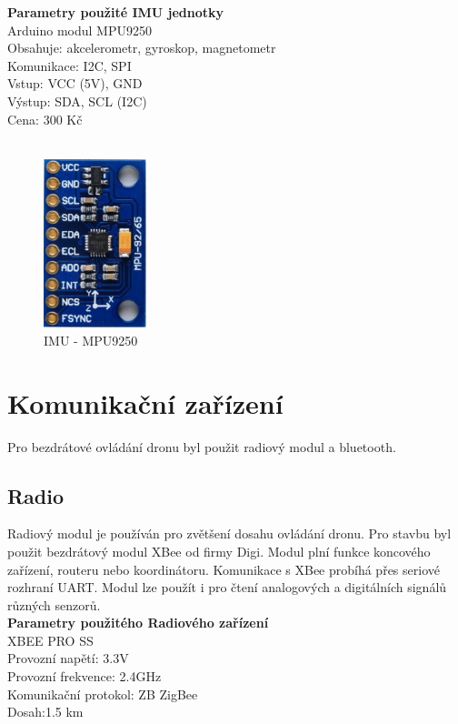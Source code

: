 
\textbf{Parametry použité IMU jednotky}\\
Arduino modul MPU9250\\
Obsahuje: akcelerometr, gyroskop, magnetometr\\
Komunikace: I2C, SPI\\
Vstup: VCC (5V), GND\\
Výstup: SDA, SCL (I2C)\\
Cena: 300 Kč\\
\cite{mpu9250}\\
\begin{figure}[H]
	\centering
	\includegraphics[width=3cm]{pictures/imu.jpg}
	\caption{IMU - MPU9250}
\end{figure}
 
\section{Komunikační zařízení} 
Pro bezdrátové ovládání dronu byl použit radiový modul a bluetooth.\\

\subsection{Radio} 
Radiový modul je používán pro zvětšení dosahu ovládání dronu. Pro stavbu byl použit bezdrátový modul XBee od firmy Digi. Modul plní funkce koncového zařízení, routeru nebo koordinátoru. Komunikace s XBee probíhá přes seriové rozhraní UART. Modul lze použít i pro čtení analogových a digitálních signálů různých senzorů.\\

\textbf{Parametry použitého Radiového zařízení}\\
XBEE PRO SS\\
Provozní napětí: 3.3V\\
Provozní frekvence: 2.4GHz\\
Komunikační protokol: ZB ZigBee\\
Dosah:1.5 km\\
\cite{xbee}\\

